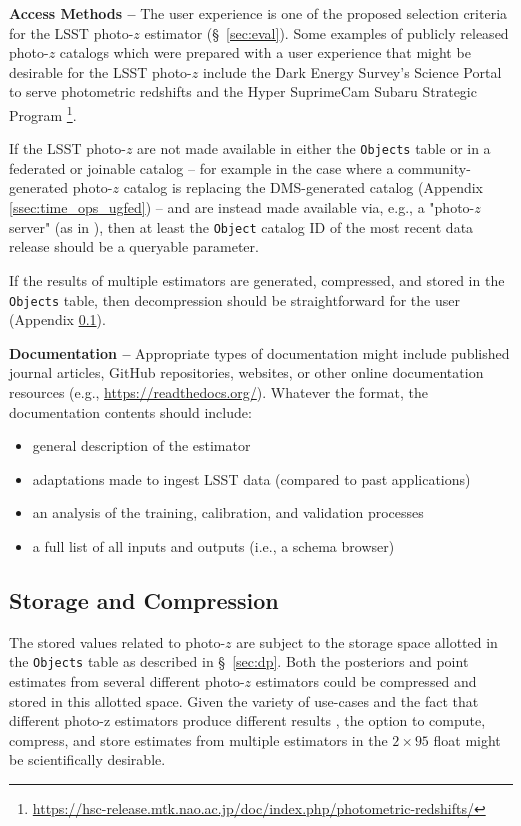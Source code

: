 \documentclass[DM,authoryear,toc]{lsstdoc}
\begin{document}
\begin{enumerate}
{\bf Access Methods --} 
The user experience is one of the proposed selection criteria for the LSST photo-$z$ estimator (\S~\ref{sec:eval}). 
Some examples of publicly released photo-$z$ catalogs which were prepared with a user experience that might be desirable for the LSST photo-$z$ include the Dark Energy Survey's Science Portal to serve photometric redshifts \cite{2018A&C....25...58G} and the Hyper SuprimeCam Subaru Strategic Program \cite{2018PASJ...70S...9T}\footnote{\url{https://hsc-release.mtk.nao.ac.jp/doc/index.php/photometric-redshifts/}}.

If the LSST photo-$z$ are not made available in either the {\tt Objects} table or in a federated or joinable catalog -- for example in the case where a community-generated photo-$z$ catalog is replacing the DMS-generated catalog (Appendix \ref{ssec:time_ops_ugfed}) -- and are instead made available via, e.g., a "photo-$z$ server" (as in \cite{2018A&C....25...58G}), then at least the {\tt Object} catalog ID of the most recent data release should be a queryable parameter.

If the results of multiple estimators are generated, compressed, and stored in the {\tt Objects} table, then decompression should be straightforward for the user (Appendix \ref{ssec:dp_store}).

{\bf Documentation --} 
Appropriate types of documentation might include published journal articles, GitHub repositories, websites, or other online documentation resources (e.g., \url{https://readthedocs.org/}). Whatever the format, the documentation contents should include: 
\vspace{-15pt}
\begin{itemize}
\item general description of the estimator
\item adaptations made to ingest LSST data (compared to past applications)
\item an analysis of the training, calibration, and validation processes
\item a full list of all inputs and outputs (i.e., a schema browser)
\end{itemize}

\subsection{Storage and Compression}\label{ssec:dp_store}

The stored values related to photo-$z$ are subject to the storage space allotted in the {\tt Objects} table as described in \S~\ref{sec:dp}.
Both the posteriors and point estimates from several different photo-$z$ estimators could be compressed and stored in this allotted space.
Given the variety of use-cases and the fact that different photo-z estimators produce different results \citep{2020MNRAS.499.1587S}, the option to compute, compress, and store estimates from multiple estimators in the $2\times95$ float might be scientifically desirable.


\end{enumerate}
\end{document}
